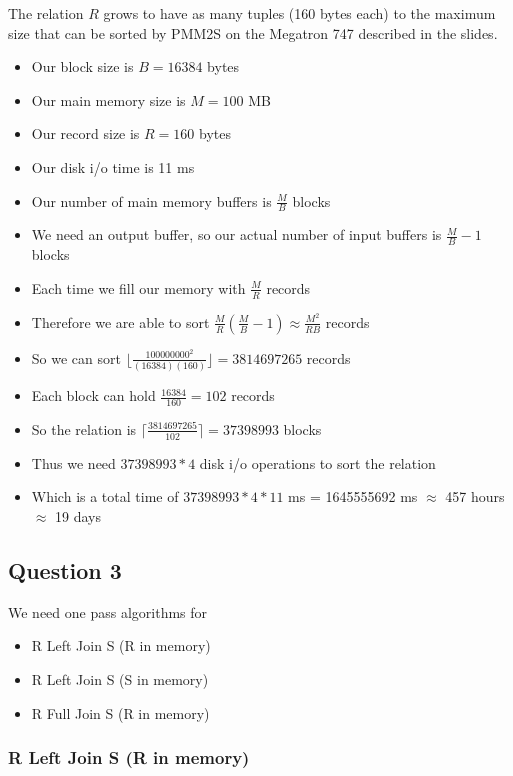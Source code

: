 \documentclass[
  letterpaper,
  DIV=11,
  numbers=noendperiod]{scrartcl}
\providecommand{\tightlist}{%
  \setlength{\itemsep}{0pt}\setlength{\parskip}{0pt}}\usepackage{longtable,booktabs,array}
\begin{document}
The relation \(R\) grows to have as many tuples (160 bytes each) to the
maximum size that can be sorted by PMM2S on the Megatron 747 described
in the slides.

\begin{itemize}
\tightlist
\item
  Our block size is \(B = 16384\) bytes
\item
  Our main memory size is \(M = 100\) MB
\item
  Our record size is \(R = 160\) bytes
\item
  Our disk i/o time is 11 ms
\item
  Our number of main memory buffers is \(\frac{M}{B}\) blocks
\item
  We need an output buffer, so our actual number of input buffers is
  \(\frac{M}{B} -1\) blocks
\item
  Each time we fill our memory with \(\frac{M}{R}\) records
\item
  Therefore we are able to sort
  \(\frac{M}{R} (\frac{M}{B} -1) \approx \frac{M^2}{RB}\) records
\item
  So we can sort
  \(\lfloor \frac{100000000^{2}}{(16384)(160)} \rfloor = 3814697265\)
  records
\item
  Each block can hold \(\frac{16384}{160} = 102\) records
\item
  So the relation is \(\lceil \frac{3814697265}{102} \rceil = 37398993\)
  blocks
\item
  Thus we need \(37398993 * 4\) disk i/o operations to sort the relation
\item
  Which is a total time of \(37398993 * 4 * 11\) ms = 1645555692 ms
  \(\approx\) 457 hours \(\approx\) 19 days
\end{itemize}

\hypertarget{question-3}{%
\subsection{Question 3}\label{question-3}}

We need one pass algorithms for

\begin{itemize}
\tightlist
\item
  R Left Join S (R in memory)
\item
  R Left Join S (S in memory)
\item
  R Full Join S (R in memory)
\end{itemize}

\hypertarget{r-left-join-s-r-in-memory}{%
\subsubsection{R Left Join S (R in
memory)}\label{r-left-join-s-r-in-memory}}
\end{document}
